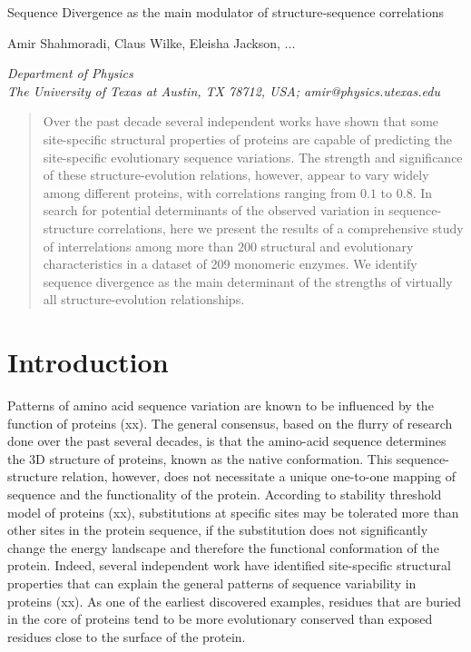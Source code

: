 \documentclass[11pt]{article}
\makeatletter
\newcommand\pubnumber{}
\newcommand\pubdate{\today}
\def\affiliation{Department of Physics \\
The University of Texas at Austin, TX 78712, USA; amir@physics.utexas.edu}
\def\Title#1{\begin{center} {\Large #1 } \end{center}}
\def\Author#1{\begin{center}{ \sc #1} \end{center}}
\def\Address#1{\begin{center}{ \it #1} \end{center}}
\newcommand\pubblock{\rightline{\begin{tabular}{l} \pubnumber\\
         \pubdate  \end{tabular}}}
\newenvironment{Abstract}{\begin{quotation}  }{\end{quotation}}
\makeatother
\begin{document}
\begin{titlepage}
\pubblock

\vfill
\Title{Sequence Divergence as the main modulator of structure-sequence correlations}
\vfill
\Author{Amir Shahmoradi, Claus Wilke, Eleisha Jackson, ...}%
\Address{\affiliation}
\vfill
\begin{Abstract}
    Over the past decade several independent works have shown that some site-specific structural properties of proteins are capable of predicting the site-specific evolutionary sequence variations. The strength and significance of these structure-evolution relations, however, appear to vary widely among different proteins, with correlations ranging from $0.1$ to $0.8$. In search for potential determinants of the observed variation in sequence-structure correlations, here we present the results of a comprehensive study of interrelations among more than $200$ structural and evolutionary characteristics in a dataset of 209 monomeric enzymes. We identify sequence divergence as the main determinant of the strengths of virtually all structure-evolution relationships.
\end{Abstract}
\vfill
\vfill
\end{titlepage}
\def\thefootnote{\fnsymbol{footnote}}
\setcounter{footnote}{0}
%

\section{Introduction}
\label{sec:intro}

    Patterns of amino acid sequence variation are known to be influenced by the function of proteins (xx). The general consensus, based on the flurry of research done over the past several decades, is that the amino-acid sequence determines the 3D structure of proteins, known as the native conformation. This sequence-structure relation, however, does not necessitate a unique one-to-one mapping of sequence and the functionality of the protein. According to stability threshold model of proteins (xx), substitutions at specific sites may be tolerated more than other sites in the protein sequence, if the substitution does not significantly change the energy landscape and therefore the functional conformation of the protein. Indeed, several independent work have identified site-specific structural properties that can explain the general patterns of sequence variability in proteins (xx). As one of the earliest discovered examples, residues that are buried in the core of proteins tend to be more evolutionary conserved than exposed residues close to the surface of the protein.
    \\
\end{document}
